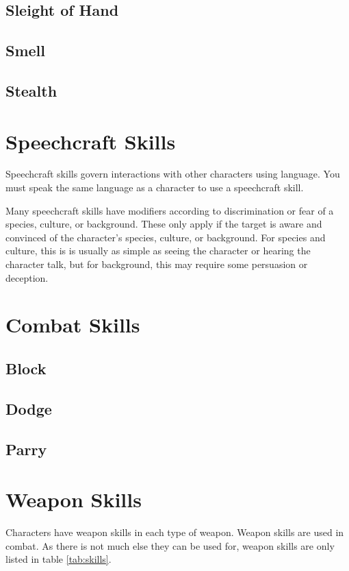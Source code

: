 \begin{multicols*}{2}
    \subsection*{Sleight of Hand}\label{skill:sleight-of-hand}

    \subsection*{Smell}\label{skill:smell}

    \subsection*{Stealth}\label{skill:stealth}

    \section{Speechcraft Skills}\label{speechcraft-skills}
    Speechcraft skills govern interactions with other characters using language.
    You must speak the same language as a character to use a speechcraft skill.

    Many speechcraft skills have modifiers according to discrimination or fear of
    a species, culture, or background. These only apply if the target is aware and
    convinced of the character's species, culture, or background. For species and
    culture, this is is usually as simple as seeing the character or hearing the
    character talk, but for background, this may require some persuasion or
    deception.

    \section{Combat Skills}

    \subsection*{Block}\label{skill:block}

    \subsection*{Dodge}\label{skill:dodge}

    \subsection*{Parry}\label{skill:parry}

    \section{Weapon Skills}\label{weapon-skills}
    Characters have weapon skills in each type of weapon. Weapon skills are used in
    combat. As there is not much else they can be used for, weapon skills are only
    listed in table \ref{tab:skills}.


\end{multicols*}
